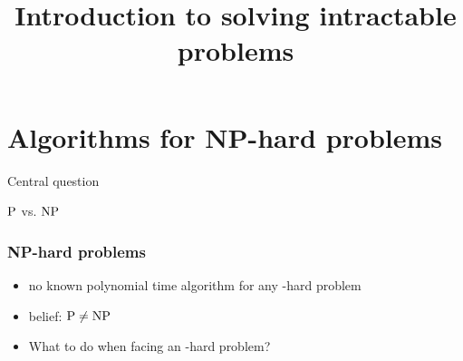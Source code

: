
\title[Introduction]
{Introduction to solving intractable problems}

\newcommand{\mycomp}[1]{\pgfmathparse{#1}\pgfmathprintnumber[precision=0]{\pgfmathresult}}



\begin{frame}
  \titlepage{}
\end{frame}

\lecturenotes{\maketitle}

\begin{frame}
  \tableofcontents
\end{frame}

\section{Algorithms for NP-hard problems}

\begin{frame}

Central question
\begin{center}
{\huge $\P$ vs. $\NP$}
\end{center}
\end{frame}

\begin{frame}
 \frametitle{NP-hard problems}

 \begin{itemize}
  \item no known polynomial time algorithm for any \NP-hard problem
  \item belief: $\P \neq \NP$ 
  \item What to do when facing an \NP-hard problem?
 \end{itemize}
\end{frame}


